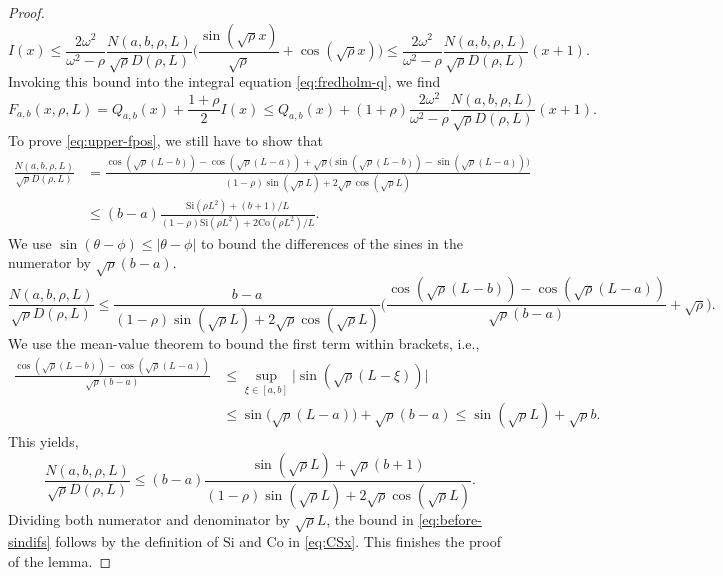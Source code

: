 \documentclass[a4paper, a4wide, 10pt, reqno]{amsart}
\theoremstyle{plain}
\theoremstyle{definition}
\numberwithin{equation}{section}
\newcommand{\Co}{{\mathrm{Co}}}
\newcommand{\Si}{{\mathrm{Si}}}
\begin{document}
\begin{proof}
        \[
        I(x)\le \frac{2\omega^2}{\omega^2-\rho}\frac{N(a,b, \rho, L)}{\sqrt{\rho}D(\rho, L)}\bigg(\frac{\sin(\sqrt{\rho}x)}{\sqrt{\rho}}+\cos(\sqrt{\rho}x)\bigg)\le \frac{2\omega^2}{\omega^2-\rho}\frac{N(a,b, \rho, L)}{\sqrt{\rho}D(\rho, L)}(x+1).
        \]
        Invoking this bound into the integral equation \eqref{eq:fredholm-q}, we find 
        \[
        F_{a,b}(x, \rho, L)=Q_{a,b}(x) + \frac{1+\rho}{2}I(x) \le Q_{a,b}(x) + (1+\rho)\frac{2\omega^2}{\omega^2-\rho}\frac{N(a,b, \rho, L)}{\sqrt{\rho}D(\rho, L)}(x+1).
        \]
        To prove \eqref{eq:upper-fpos}, we still have to show that 
        \begin{equation}\label{eq:before-sindifs}
        \begin{aligned}
        \frac{N(a,b, \rho, L)}{\sqrt{\rho}D(\rho, L)} &=\frac{\cos(\sqrt{\rho}(L-b))-\cos(\sqrt{\rho}(L-a)) + \sqrt{\rho}\big(\sin(\sqrt{\rho}(L-b))-\sin(\sqrt{\rho}(L-a))\big)}{(1-\rho)\sin(\sqrt{\rho}L)+2\sqrt{\rho}\cos(\sqrt{\rho}L)} \\&\le (b-a)\frac{\Si(\rho L^2) + (b+1)/L}{(1-\rho)\Si(\rho L^2) + 2\Co(\rho L^2)/L}.
        \end{aligned}
        \end{equation}
        We use $\sin(\theta-\phi)\le |\theta-\phi|$ to bound the differences of the sines in the numerator by $\sqrt{\rho}(b-a)$. 
        \[
        \frac{N(a,b, \rho, L)}{\sqrt{\rho}D(\rho, L)} \le \frac{b-a}{(1-\rho)\sin(\sqrt{\rho}L)+2\sqrt{\rho}\cos(\sqrt{\rho}L)}\bigg( \frac{\cos(\sqrt{\rho}(L-b))-\cos(\sqrt{\rho}(L-a))}{\sqrt{\rho}(b-a)}+ \sqrt{\rho}\bigg).
        \]
        We use the mean-value theorem to bound the first term within brackets, i.e., 
        \[
        \begin{aligned}
         \frac{\cos(\sqrt{\rho}(L-b))-\cos(\sqrt{\rho}(L-a))}{\sqrt{\rho}(b-a)} &\le \sup_{\xi\in[a,b]}\Big|\sin(\sqrt{\rho}(L-\xi))\Big|\\&\le \sin\big(\sqrt{\rho}(L-a)\big)+\sqrt{\rho}(b-a) \le \sin(\sqrt{\rho}L) + \sqrt{\rho}b.\end{aligned}
        \]
        This yields, 
        \[
        \frac{N(a,b, \rho, L)}{\sqrt{\rho}D(\rho, L)} \le (b-a)\frac{\sin(\sqrt{\rho}L) + \sqrt{\rho}(b+1)}{(1-\rho)\sin(\sqrt{\rho}L)+2\sqrt{\rho}\cos(\sqrt{\rho}L)}.
        \]
        Dividing both numerator and denominator by $\sqrt{\rho}L$, the bound in \eqref{eq:before-sindifs} follows by the definition of $\Si$ and $\Co$ in \eqref{eq:CSx}. This finishes the proof of the lemma.
    \end{proof}
    \pagebreak[3]
    
\end{document}
